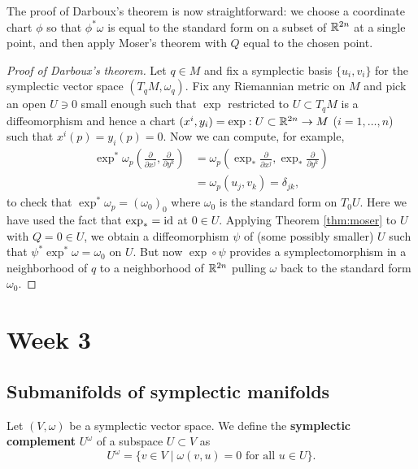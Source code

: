 \documentclass{amsart}
\begin{document}
The proof of Darboux's theorem is now straightforward: we choose a coordinate chart $\phi$ so that
$\phi^*\omega$ is equal to the standard form on a subset of $\mathbb{R}^{2n}$ at a single point, and then
apply Moser's theorem with $Q$ equal to the chosen point.

\begin{proof}[Proof of Darboux's theorem]
    Let $q\in M$ and fix a symplectic basis $\{u_i,v_i\}$ for the symplectic vector space $(T_qM,\omega_q)$.
    Fix any Riemannian metric on $M$ and pick an open $U\ni 0$ small enough such that $\exp$ restricted to
    $U\subset T_qM$ is a diffeomorphism and hence a chart $(x^i,y_i)=\exp:U\subset\mathbb{R}^{2n}\to M$
    ($i=1,\ldots,n$) such that $x^i(p)=y_i(p)=0$. Now we can compute, for example,
    \begin{align*}
        \exp^*\omega_p\left( \frac{\partial}{\partial x^j},\frac{\partial}{\partial y^k} \right) &=\omega_p\left(\exp_*\frac{\partial}{\partial x^j},\exp_*\frac{\partial}{\partial y^k}\right)\\
        &=\omega_p\left( u_j,v_k \right)=\delta_{jk},
    \end{align*}
    to check that $\exp^*\omega_p=(\omega_0)_0$ where $\omega_0$ is the standard form on $T_0U$.
    Here we have used the fact that $\exp_*=\operatorname{id}$ at $0\in U$.
    Applying Theorem \ref{thm:moser} to $U$ with $Q=0\in U$, we obtain a diffeomorphism $\psi$ of
    (some possibly smaller) $U$ such that $\psi^*\exp^*\omega=\omega_0$ on $U$. But now
    $\exp\circ\psi$ provides a symplectomorphism in a neighborhood of $q$ to a neighborhood of $\mathbb{R}^{2n}$
    pulling $\omega$ back to the standard form $\omega_0$.
\end{proof}

\newpage

\section{Week 3}


\subsection{Submanifolds of symplectic manifolds}

\begin{definition}
    Let $(V,\omega)$ be a symplectic vector space. We define the \textbf{symplectic complement}
    $U^{\omega}$ of a subspace $U\subset V$ as
    \begin{equation*}
        U^{\omega} = \{v\in V \mid \omega(v,u)=0\text{ for all }u\in U\}.
    \end{equation*}
\end{definition}
\end{document}

